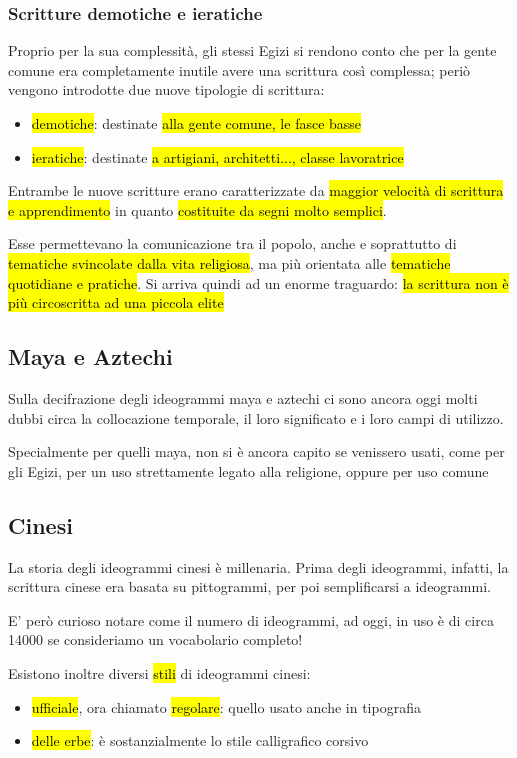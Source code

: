     \subsubsection{Scritture demotiche e ieratiche}
    Proprio per la sua complessità, gli stessi Egizi si rendono conto che per la gente comune era completamente inutile avere una scrittura così complessa; periò vengono introdotte due nuove tipologie di scrittura:
    \begin{itemize}
        \item \hl{demotiche}: destinate \hl{alla gente comune, le fasce basse} 
        \item \hl{ieratiche}: destinate \hl{a artigiani, architetti..., classe lavoratrice}
    \end{itemize}
    Entrambe le nuove scritture erano caratterizzate da \hl{maggior velocità di scrittura e apprendimento} in quanto \hl{costituite da segni molto semplici}.
    
    Esse permettevano la comunicazione tra il popolo, anche e soprattutto di \hl{tematiche svincolate dalla vita religiosa}, ma più orientata alle \hl{tematiche quotidiane e pratiche}. Si arriva quindi ad un enorme traguardo: \hl{la scrittura non è più circoscritta ad una piccola elite}

    
    \subsection{Maya e Aztechi}
    Sulla decifrazione degli ideogrammi maya e aztechi ci sono ancora oggi molti dubbi circa la collocazione temporale, il loro significato e i loro campi di utilizzo.

    Specialmente per quelli maya, non si è ancora capito se venissero usati, come per gli Egizi, per un uso strettamente legato alla religione, oppure per uso comune
    \subsection{Cinesi}
    La storia degli ideogrammi cinesi è millenaria. Prima degli ideogrammi, infatti, la scrittura cinese era basata su pittogrammi, per poi semplificarsi a ideogrammi.

    E' però curioso notare come il numero di ideogrammi, ad oggi, in uso è di circa 14000 se consideriamo un vocabolario completo!

    Esistono inoltre diversi \hl{stili} di ideogrammi cinesi:
    \begin{itemize}
        \item \hl{ufficiale}, ora chiamato \hl{regolare}: quello usato anche in tipografia
        \item \hl{delle erbe}: è sostanzialmente lo stile calligrafico corsivo
    \end{itemize}


